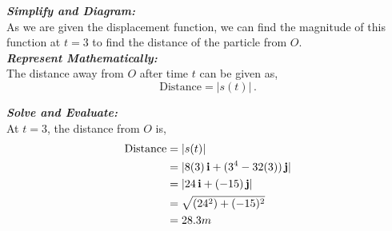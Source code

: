 \begin{subquestions}
\begin{subsubquestions}

\subsubquestion

\textbf{\textit{Simplify and Diagram:}} \\
As we are given the displacement function, we can find the magnitude of this function at $t=3$ to find the distance of the particle from $O$. \\




\textbf{\textit{Represent Mathematically:}} \\
The distance away from $O$ after time $t$ can be given as,
\begin{equation}
	\text{Distance} = |s(t)| \,.
\end{equation}




\textbf{\textit{Solve and Evaluate:}} \\
At $t=3$, the distance from $O$ is,
\begin{align}
	\text{Distance} & = |s(t)| \nonumber \\
	                & = |8(3)\,\mathbf{i} + (3^4-32(3))\,\mathbf{j}| \nonumber \\
	                & = |24\,\mathbf{i} + (-15)\,\mathbf{j}| \nonumber \\
	                & = \sqrt{(24^2)+(-15)^2} \nonumber \\
	                & = 28.3m
\end{align}


\end{subsubquestions}


\end{subquestions}









